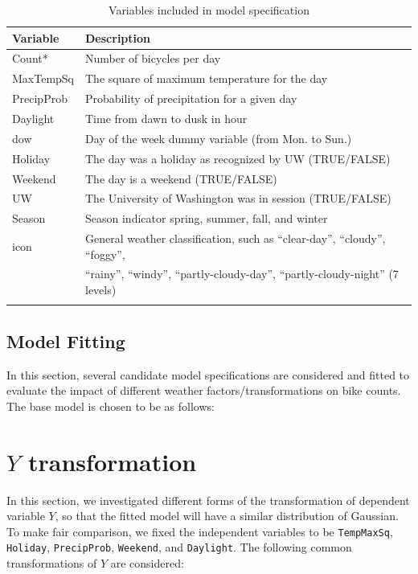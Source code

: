 \documentclass [11pt, proquest] {uwthesis}[2015/03/03]
\begin{document}
\begin{table}
\begin{center}
\caption{Variables included in model specification}
\vspace{10pt}
\begin{tabular}{l l} 
 \hline
Variable & Description \\
\hline
Count* & Number of bicycles per day \\
MaxTempSq & The square of maximum temperature for the day \\
PrecipProb & Probability of precipitation for a given day \\
Daylight & Time from dawn to dusk in hour\\
dow & Day of the week dummy variable (from Mon. to Sun.) \\
Holiday & The day was a holiday as recognized by UW (TRUE/FALSE) \\
Weekend & The day is a weekend (TRUE/FALSE) \\
UW & The University of Washington was in session (TRUE/FALSE) \\
Season & Season indicator spring, summer, fall, and winter \\
icon & General weather classification, such as ``clear-day'', ``cloudy'', ``foggy'', \\
 & ``rainy'', ``windy'', ``partly-cloudy-day'', ``partly-cloudy-night'' (7 levels)\\
\hline
\label{tb:variables}
\end{tabular}
\end{center}
\end{table}

\subsection{Model Fitting}

In this section, several candidate model specifications are considered and fitted to evaluate the impact of different weather factors/transformations on bike counts. The base model is chosen to be as follows:


\section{$Y$ transformation}

In this section, we investigated different forms of the transformation of dependent variable $Y$, so that the fitted model will have a similar distribution of Gaussian.  To make fair comparison, we fixed the independent variables to be \texttt{TempMaxSq}, \texttt{Holiday}, \texttt{PrecipProb}, \texttt{Weekend}, and \texttt{Daylight}. The following common transformations of $Y$ are considered:
\end{document}
